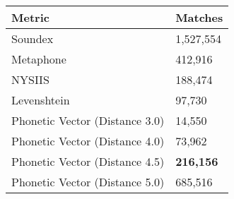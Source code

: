 \begin{tabular}{ll}
    Metric & Matches \\
    \hline
    Soundex     & 1,527,554 \\
    Metaphone   & 412,916 \\
    NYSIIS      & 188,474 \\
    Levenshtein & 97,730 \\
    \hline
    Phonetic Vector (Distance 3.0)  & 14,550 \\
    Phonetic Vector (Distance 4.0)  & 73,962 \\
    Phonetic Vector (Distance 4.5)  & \textbf{216,156} \\
    Phonetic Vector (Distance 5.0)  & 685,516 \\
\end{tabular}